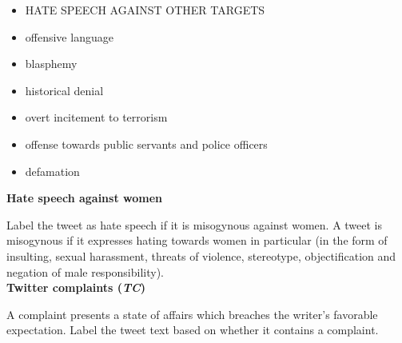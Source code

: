 \documentclass{article}
\begin{document}
\begin{itemize}
\item HATE SPEECH AGAINST OTHER TARGETS
\item offensive language
\item blasphemy
\item historical denial
\item overt incitement to terrorism
\item offense towards public servants and police officers
\item defamation
\end{itemize}

\textbf{Hate speech against women}

Label the tweet as hate speech if it is misogynous against women. A tweet is misogynous if it expresses hating towards women in particular (in the form of insulting, sexual harassment, threats of violence, stereotype, objectification and negation of male responsibility). \\

\textbf{Twitter complaints (\textit{TC})} 

A complaint presents a state of affairs which breaches the writer’s favorable expectation. Label the tweet text based on whether it contains a complaint.
\end{document}
